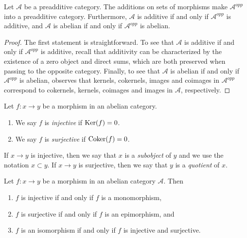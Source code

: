 \begin{lemma}
\label{lemma-abelian-opposite}
Let $\mathcal{A}$ be a preadditive category.
The additions on sets of morphisms make
$\mathcal{A}^{opp}$ into a preadditive
category.
Furthermore, $\mathcal{A}$ is additive if and
only if $\mathcal{A}^{opp}$
is additive, and
$\mathcal{A}$ is abelian if and only if
$\mathcal{A}^{opp}$ is abelian.
\end{lemma}

\begin{proof}
The first statement is straightforward.
To see that $\mathcal{A}$ is additive if and
only if $\mathcal{A}^{opp}$
is additive, recall that additivity can be
characterized by
the existence of a zero object and direct
sums, which are both
preserved when passing to the opposite
category.
Finally, to see that
$\mathcal{A}$ is abelian if and only if
$\mathcal{A}^{opp}$ is abelian,
observes that kernels, cokernels, images and
coimages in
$\mathcal{A}^{opp}$ correspond to
cokernels, kernels, coimages and images in
$\mathcal{A}$,
respectively.
\end{proof}

\begin{definition}
\label{definition-injective-surjective}
Let $f : x \to y$ be a morphism in an abelian
category.
\begin{enumerate}
\item We say $f$ is {\it injective} if
$\mathop{\mathrm{Ker}}(f) = 0$.
\item We say $f$ is {\it surjective} if
$\mathop{\mathrm{Coker}}(f) = 0$.
\end{enumerate}
If $x \to y$ is injective, then we say that
$x$ is a {\it subobject}
of $y$ and we use the notation $x \subset y$.
If $x \to y$ is
surjective, then we say that $y$ is a {\it
quotient} of $x$.
\end{definition}

\begin{lemma}
\label{lemma-characterize-injective}
Let $f : x \to y$ be a morphism in an abelian
category $\mathcal{A}$. Then
\begin{enumerate}
\item $f$ is injective if and only if $f$ is
a monomorphism,
\item $f$ is surjective if and only if $f$ is
an epimorphism, and
\item $f$ is an isomorphism if and only if
$f$ is injective and surjective.
\end{enumerate}
\end{lemma}

